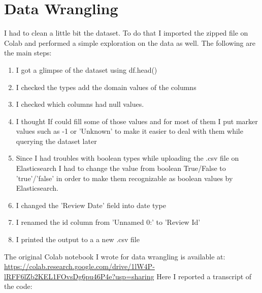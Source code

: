\documentclass{Configuration_Files/PoliMi3i_thesis}
\begin{document}
\chapter{Data Wrangling}
I had to clean a little bit the dataset. To do that I imported the zipped file on Colab and performed a simple exploration on the data as well.
\newline
The following are the main steps: 
\begin{enumerate}
    \item I got a glimpse of the dataset using df.head()
    \item I checked the types add the domain values of the columns
    \item I checked which columns had null values.
    \item I thought If could fill some of those values and for most of them I put marker values such as -1 or 'Unknown' to make it easier to deal with them while querying the dataset later
    \item Since I had troubles with boolean types while uploading the .csv file on Elasticsearch I had to change the value from boolean True/False to 'true'/'false' in order to make them recognizable as boolean values by Elasticsearch.
    \item I changed the 'Review Date' field into date type
    \item I renamed the id column from 'Unnamed 0:' to 'Review Id'
    \item I printed the output to a a new .csv file
\end{enumerate}
The original Colab notebook I wrote for data wrangling is available at: 
\\
\href{https://colab.research.google.com/drive/1lW4P-lRFF6lZb2KEL1FOvsDg6pu46P4e?usp=sharing}{https://colab.research.google.com/drive/1lW4P-lRFF6lZb2KEL1FOvsDg6pu46P4e?usp=sharing}
Here I reported a transcript of the code:
\end{document}
